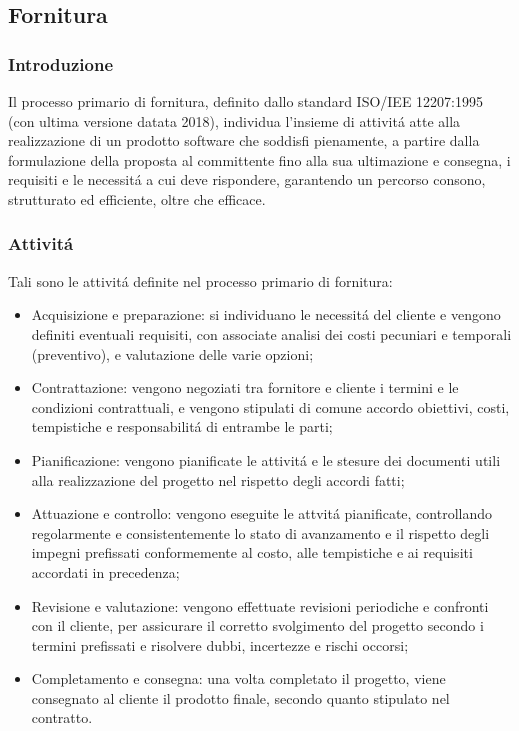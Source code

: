 
\subsection{Fornitura}
\subsubsection{Introduzione}
Il processo primario di fornitura, definito dallo standard ISO/IEE 12207:1995 (con ultima versione datata 2018), individua l'insieme di attivitá atte alla realizzazione di un prodotto software che soddisfi pienamente, a partire dalla formulazione della proposta al committente fino alla sua ultimazione e consegna, i requisiti e le necessitá a cui deve rispondere, garantendo un percorso consono, strutturato ed efficiente, oltre che efficace.

\subsubsection{Attivitá}
Tali sono le attivitá definite nel processo primario di fornitura:

\begin{itemize}
    \item Acquisizione e preparazione: si individuano le necessitá del cliente e vengono definiti eventuali requisiti, con associate analisi dei costi pecuniari e temporali (preventivo), e valutazione delle varie opzioni;
    \item Contrattazione: vengono negoziati tra fornitore e cliente i termini e le condizioni contrattuali, e vengono stipulati di comune accordo obiettivi, costi, tempistiche e responsabilitá di entrambe le parti;
    \item Pianificazione: vengono pianificate le attivitá e le stesure dei documenti utili alla realizzazione del progetto nel rispetto degli accordi fatti;
    \item Attuazione e controllo: vengono eseguite le attvitá pianificate, controllando regolarmente e consistentemente lo stato di avanzamento e il rispetto degli impegni prefissati conformemente al costo, alle tempistiche e ai requisiti accordati in precedenza;
    \item Revisione e valutazione: vengono effettuate revisioni periodiche e confronti con il cliente, per assicurare il corretto svolgimento del progetto secondo i termini prefissati e risolvere dubbi, incertezze e rischi occorsi;
    \item Completamento e consegna: una volta completato il progetto, viene consegnato al cliente il prodotto finale, secondo quanto stipulato nel contratto.
\end{itemize}

